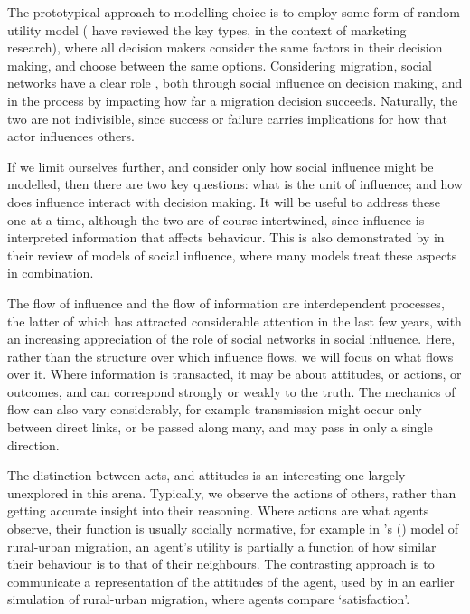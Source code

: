 \documentclass{article}
\begin{document}
The prototypical approach to modelling choice is to employ some form of random utility model (\citet{Baltas2001} have reviewed the key types, in the context of marketing research), where all decision makers consider the same factors in their decision making, and choose between the same options. Considering migration, social networks have a clear role \citep{Epstein2006}, both through social influence on decision making, and in the process by impacting how far a migration decision succeeds. Naturally, the two are not indivisible, since success or failure carries implications for how that actor influences others.

If we limit ourselves further, and consider only how social influence might be modelled, then there are two key questions: what is the unit of influence; and how does influence interact with decision making. It will be useful to address these one at a time, although the two are of course intertwined, since influence is interpreted information that affects behaviour. This is also demonstrated by \citet{Mason2007} in their review of models of social influence, where many models treat these aspects in combination.

The flow of influence and the flow of information are interdependent processes, the latter of which has attracted considerable attention in the last few years, with an increasing appreciation of the role of social networks in social influence. Here, rather than the structure over which influence flows, we will focus on what flows over it. 
Where information is transacted, it may be about attitudes, or actions, or outcomes, and can correspond strongly or weakly to the truth. The mechanics of flow can also vary considerably, for example transmission might occur only between direct links, or be passed along many, and may pass in only a single direction.

The distinction between acts, and attitudes is an interesting one largely unexplored in this arena. Typically, we observe the actions of others, rather than getting accurate insight into their reasoning. Where actions are what agents observe, their function is usually socially normative, for example in \citeauthor{Silveira2005}'s (\citeyear{Silveira2005}) model of rural-urban migration, an agent's utility is partially a function of how similar their behaviour is to that of their neighbours. The contrasting approach is to communicate a representation of the attitudes of the agent, used by \citet{Espindola2006} in an earlier simulation of rural-urban migration, where agents compare `satisfaction'.
\end{document}
